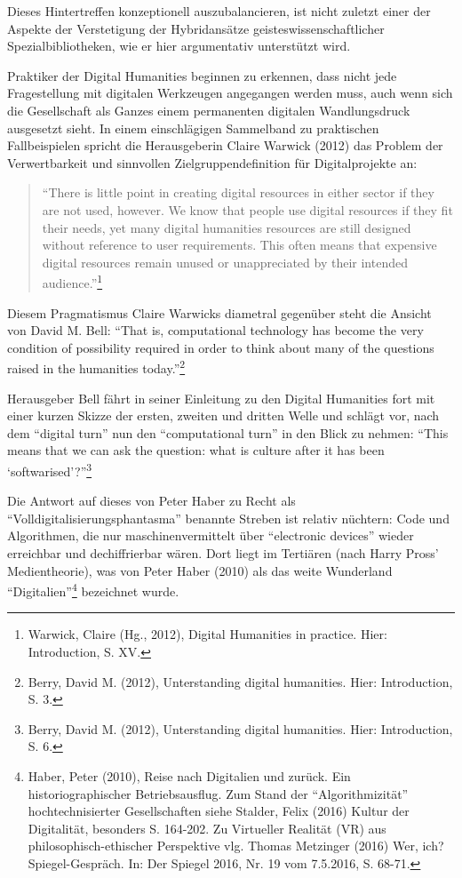 \documentclass[a4paper,
fontsize=11pt,
oneside,
numbers=noperiodatend,
parskip=half-,
bibliography=totoc,
final
]{scrartcl}
\begin{document}
Dieses Hintertreffen konzeptionell auszubalancieren, ist nicht zuletzt
einer der Aspekte der Verstetigung der Hybridansätze
geisteswissenschaftlicher Spezialbibliotheken, wie er hier argumentativ
unterstützt wird.

Praktiker der Digital Humanities beginnen zu erkennen, dass nicht jede
Fragestellung mit digitalen Werkzeugen angegangen werden muss, auch wenn
sich die Gesellschaft als Ganzes einem permanenten digitalen
Wandlungsdruck ausgesetzt sieht. In einem einschlägigen Sammelband zu
praktischen Fallbeispielen spricht die Herausgeberin Claire Warwick
(2012) das Problem der Verwertbarkeit und sinnvollen
Zielgruppendefinition für Digitalprojekte an:

\begin{quote}
\enquote{There is little point in creating digital resources in either
sector if they are not used, however. We know that people use digital
resources if they fit their needs, yet many digital humanities resources
are still designed without reference to user requirements. This often
means that expensive digital resources remain unused or unappreciated by
their intended audience.}\footnote{Warwick, Claire (Hg., 2012), Digital
  Humanities in practice. Hier: Introduction, S. XV.}
\end{quote}

Diesem Pragmatismus Claire Warwicks diametral gegenüber steht die
Ansicht von David M. Bell: \enquote{That is, computational technology
has become the very condition of possibility required in order to think
about many of the questions raised in the humanities today.}\footnote{Berry,
  David M. (2012), Unterstanding digital humanities. Hier: Introduction,
  S. 3.}

Herausgeber Bell fährt in seiner Einleitung zu den Digital Humanities
fort mit einer kurzen Skizze der ersten, zweiten und dritten Welle und
schlägt vor, nach dem \enquote{digital turn} nun den
\enquote{computational turn} in den Blick zu nehmen: \enquote{This means
that we can ask the question: what is culture after it has been
\enquote{softwarised}?}\footnote{Berry, David M. (2012), Unterstanding
  digital humanities. Hier: Introduction, S. 6.}

Die Antwort auf dieses von Peter Haber zu Recht als
\enquote{Volldigitalisierungsphantasma} benannte Streben ist relativ
nüchtern: Code und Algorithmen, die nur maschinenvermittelt über
\enquote{electronic devices} wieder erreichbar und dechiffrierbar wären.
Dort liegt im Tertiären (nach Harry Pross' Medientheorie), was von Peter
Haber (2010) als das weite Wunderland \enquote{Digitalien}\footnote{Haber,
  Peter (2010), Reise nach Digitalien und zurück. Ein
  historiographischer Betriebsausflug. Zum Stand der
  \enquote{Algorithmizität} hochtechnisierter Gesellschaften siehe
  Stalder, Felix (2016) Kultur der Digitalität, besonders S. 164-202. Zu
  Virtueller Realität (VR) aus philosophisch-ethischer Perspektive vlg.
  Thomas Metzinger (2016) Wer, ich? Spiegel-Gespräch. In: Der Spiegel
  2016, Nr. 19 vom 7.5.2016, S. 68-71.} bezeichnet wurde.
\end{document}
